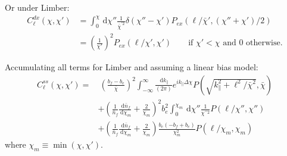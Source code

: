 \documentclass[twocolumn,prl,nofootinbib]{revtex4-1}
\newcommand{\ud}{\,\mathrm{d}}
\begin{document}
\begin{widetext}
Or under Limber:
\begin{align}
C^{dx}_\ell(\chi,\chi')
    &=
    \int_0^\chi\ud\chi''
    \frac{1}{\bar\chi^{\prime 2}}
    \delta(\chi'' - \chi')
    P_{ex}(\ell/{\bar\chi'}, (\chi'' + \chi')/2)
    \\
    &=
    \left(\frac{1}{\chi'}\right)^2
    P_{ex}(\ell/\chi', \chi')
    \qquad \textrm{if $\chi' < \chi$ and 0 otherwise.}
\end{align}

Accumulating all terms for Limber and assuming a linear bias model:
\begin{align}
C^{ss}_\ell(\chi, \chi') =&~
    \left(\frac{b_f - b_e }{\bar\chi}\right)^2
        \int_{-\infty}^\infty\frac{\ud k_\parallel}{(2 \pi)} 
        e^{i k_\parallel \Delta\chi}
        P(\sqrt{k_\parallel^2 + \ell^2/\bar\chi^2}, \bar\chi)
    \nonumber \\ &+
    \left(\frac{1}{\bar{n}_f}\frac{\ud \bar{n}_f}{\ud \chi_m}
    + \frac{2}{\chi_m} \right)^2
    b_e^2 \int_0^{\chi_m}\ud\chi''
    \frac{1}{\chi^{\prime\prime 2}}
        P(\ell/\chi'',\chi'')
    \nonumber \\ &+
    \left(\frac{1}{\bar{n}_f}\frac{\ud \bar{n}_f}{\ud \chi_m}
    + \frac{2}{\chi_m} \right)
    \frac{b_e(-b_f + b_e)}{\chi_m^2}
        P(\ell/\chi_m, \chi_m)
\end{align}
where $\chi_m \equiv \min(\chi, \chi')$.

\end{widetext}
\end{document}
